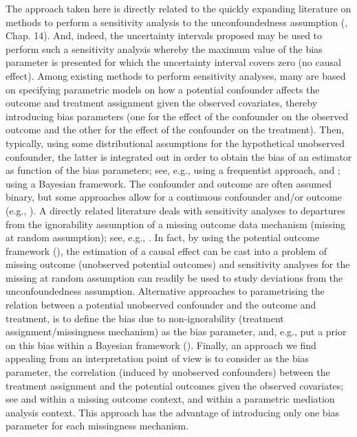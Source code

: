 \documentclass[11pt]{article}
\begin{document}
The approach taken here is directly related to the quickly expanding literature on methods to perform a sensitivity analysis to the  unconfoundedness assumption (\citealp{R:10}, Chap. 14). And, indeed, the uncertainty intervals proposed may be used to perform such a sensitivity analysis whereby the maximum value of the bias parameter is presented for which the uncertainty interval covers zero (no causal effect). Among existing methods to perform sensitivity analyses, many are based on specifying parametric models on how a potential confounder affects the outcome and treatment assignment given the observed covariates, thereby introducing bias parameters (one for the effect of the confounder on the observed outcome and the other for the effect of the confounder on the treatment). Then, typically, using some distributional assumptions for the hypothetical unobserved confounder, the latter is integrated out in order to obtain the bias of an estimator as function of the bias parameters;  see, e.g., \cite{R:10,Lin:1998,Robins:2000,Rosenbaum,I:03,VanderWeele:2011} using a frequentist approach, and \cite{Greenland:2005}; \cite{Luna:2014} using a Bayesian framework. The confounder and outcome are often assumed binary, but some approaches allow for a continuous confounder and/or outcome (e.g., \citealp{VanderWeele:2011}). A directly related literature deals with sensitivity analyses to departures from the ignorability assumption of a missing outcome data mechanism (missing at random assumption); see, e.g., \cite{Copas:01,CE:05,SDR:03, DH:08}. In fact, by using the potential outcome framework (\citealp{Rubin:1974}), the estimation of a causal effect can be cast into a problem of missing outcome (unobserved potential outcomes) and sensitivity analyses for the missing at random assumption can readily be used to study deviations from the unconfoundedness assumption. Alternative approaches to parametrising the relation between a potential unobserved confounder and the outcome and treatment, is to define the bias due to non-ignorability (treatment assignment/missingness mechanism) as the bias parameter, and, e.g., put a prior on this bias within a Bayesian framework (\citealp{DH:08, Josefsson:2016}). Finally, an approach we find appealing from an interpretation point of view is to consider as the bias parameter, the correlation (induced by unobserved confounders) between the treatment assignment and the potential outcomes given the observed covariates; see \cite{CopasLi} and \cite{Genback:2015} within a missing outcome context, and
\cite{Imai:2010} within a parametric mediation analysis context. This approach has the advantage of introducing only one bias parameter for each missingness mechanism.
\end{document}
